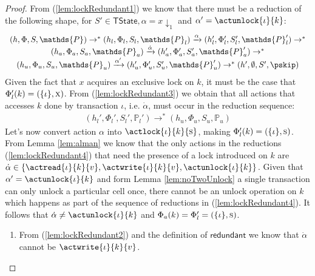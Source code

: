 \begin{lem}
\begin{proof}
	From (\ref{lem:lockRedundant1}) we know that there must be a reduction of the following shape, for $S' \in \mathsf{TState}, \alpha = x \downarrow_1$ and $\alpha' = \actunlock{\iota}{k}$:
	\begin{gather}
		\label{lem:lockRedundant3}
		\begin{array}{c}
			(h, \Phi, S, \mathds{P})
				\rightarrow^*
			(h_l, \Phi_l, S_l, \mathds{P}_l)
				\xrightarrow{\alpha}
			(h_l', \Phi_l', S_l', \mathds{P}_l')
				\rightarrow^* \\
			(h_a, \Phi_a, S_a, \mathds{P}_a)
				\xrightarrow{\dot{\alpha}}
			(h_a', \Phi_a', S_a', \mathds{P}_a')
				\rightarrow^* \\
			(h_u, \Phi_u, S_u, \mathds{P}_u)
				\xrightarrow{\alpha'}
			(h_u', \Phi_u', S_u', \mathds{P}_u')
				\rightarrow^*
			(h', \emptyset, S', \pskip)
		\end{array}
	\end{gather}
	Given the fact that $x$ acquires an exclusive lock on $k$, it must be the case that $\Phi_l'(k) = (\{\iota\}, \textsc{x})$. From (\ref{lem:lockRedundant3}) we obtain that all actions that accesses $k$ done by transaction $\iota$, i.e. $\dot{\alpha}$, must occur in the reduction sequence:
	\begin{gather}
		\label{lem:lockRedundant4}
		(h_l', \Phi_l', S_l', \mathds{P}_l') \rightarrow^* (h_u, \Phi_u, S_u, \mathds{P}_u)
	\end{gather}
	Let's now convert action $\alpha$ into $\actlock{\iota}{k}{\textsc{s}}$, making $\Phi_l'(k) = (\{\iota\}, \textsc{s})$. From Lemma \ref{lem:alman} we know that the only actions in the reductions (\ref{lem:lockRedundant4}) that need the presence of a lock introduced on $k$ are $\dot{\alpha} \in \{ \actread{\iota}{k}{v}, \actwrite{\iota}{k}{v}, \actunlock{\iota}{k} \}$. Given that $\alpha' = \actunlock{\iota}{k}$ and form Lemma \ref{lem:noTwoUnlock} a single transaction can only unlock a particular cell once, there cannot be an unlock operation on $k$ which happens as part of the sequence of reductions in (\ref{lem:lockRedundant4}). It follows that $\dot{\alpha} \neq \actunlock{\iota}{k}$ and $\Phi_a(k) = \Phi_l' = (\{\iota\}, \textsc{s})$.
	\begin{enumerate}
		\item From (\ref{lem:lockRedundant2}) and the definition of $\mathsf{redundant}$ we know that $\dot{\alpha}$ cannot be $\actwrite{\iota}{k}{v}$.
		

\end{enumerate}
\end{proof}
\end{lem}
